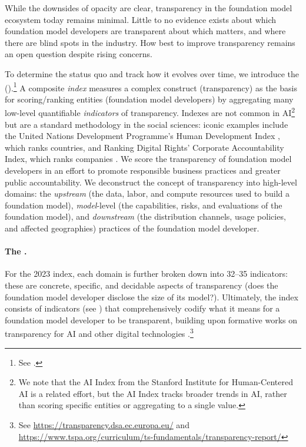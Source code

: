 While the downsides of opacity are clear, transparency in the foundation model ecosystem today remains minimal.
Little to no evidence exists about which foundation model developers are transparent about which matters, and where there are blind spots in the industry.
How best to improve transparency remains an open question despite rising concerns.


To determine the status quo and track how it evolves over time, we introduce the \projectname (\projectabbreviation).\footnote{See \indexUrl.}
A composite \textit{index} measures a complex construct (\eg transparency) as the basis for scoring/ranking entities (\eg foundation model developers) by aggregating  many low-level quantifiable \textit{indicators} of transparency.
Indexes are not common in AI\footnote{We note that the AI Index from the Stanford Institute for Human-Centered AI \citep{zhang2022ai, maslej2023ai} is a related effort, but the AI Index tracks broader trends in AI, rather than scoring specific entities or aggregating to a single value.} but are a standard methodology in the social sciences: iconic examples include the United Nations Development Programme's Human Development Index \citep{undp2022hdr}, which ranks countries, and Ranking Digital Rights' Corporate Accountability Index, which ranks companies \citep{rdr2020index}.
We score the transparency of foundation model developers in an effort to promote responsible business practices and greater public accountability. 
We deconstruct the concept of transparency into \numdomains high-level domains: the \textit{upstream} (\eg the data, labor, and compute resources used to build a foundation model), \textit{model}-level (\eg the capabilities, risks, and evaluations of the foundation model), and \textit{downstream} (\eg the distribution channels, usage policies, and affected geographies) practices of the foundation model developer.

\paragraph{The \projectversionedname.}
For the 2023 index, each domain is further broken down into 32--35 indicators: these are concrete, specific, and decidable aspects of transparency (\eg does the foundation model developer disclose the size of its model?). 
Ultimately, the index consists of \numindicators indicators (see ) that comprehensively codify what it means for a foundation model developer to be transparent, building upon formative works on transparency for AI and other digital technologies \citep{gebru2021datasheets, bender2018data, mitchell2018modelcards, raji2019actionable, gray2019ghost, crawford2021atlas, cdt2021, keller2022platform}.\footnote{See \url{https://transparency.dsa.ec.europa.eu/} and \url{https://www.tspa.org/curriculum/ts-fundamentals/transparency-report/}} 

